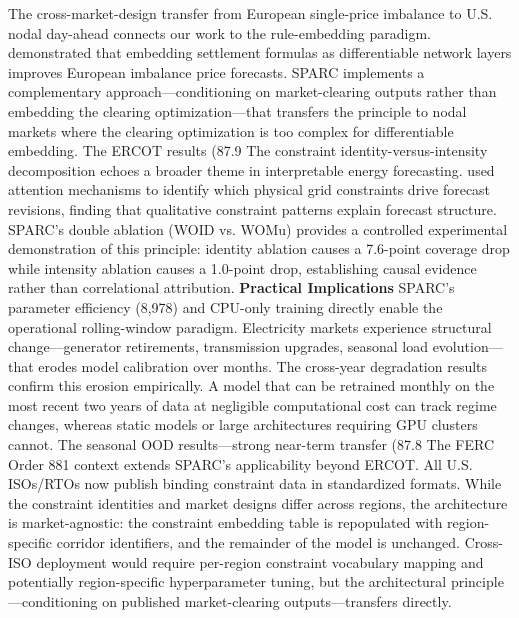 {The cross-market-design transfer from European single-price imbalance to U.S. nodal day-ahead connects our work to the rule-embedding paradigm. \cite{yu2026marketruleinformed} demonstrated that embedding settlement formulas as differentiable network layers improves European imbalance price forecasts. SPARC implements a complementary approach---conditioning on market-clearing outputs rather than embedding the clearing optimization---that transfers the principle to nodal markets where the clearing optimization is too complex for differentiable embedding. The ERCOT results (87.9%
The constraint identity-versus-intensity decomposition echoes a broader theme in interpretable energy forecasting. \cite{toubeau2021interpretable} used attention mechanisms to identify which physical grid constraints drive forecast revisions, finding that qualitative constraint patterns explain forecast structure. SPARC's double ablation (WOID vs. WOMu) provides a controlled experimental demonstration of this principle: identity ablation causes a 7.6-point coverage drop while intensity ablation causes a 1.0-point drop, establishing causal evidence rather than correlational attribution.
\textbf{Practical Implications}
SPARC's parameter efficiency (8,978) and CPU-only training directly enable the operational rolling-window paradigm. Electricity markets experience structural change---generator retirements, transmission upgrades, seasonal load evolution---that erodes model calibration over months. The cross-year degradation results confirm this erosion empirically. A model that can be retrained monthly on the most recent two years of data at negligible computational cost can track regime changes, whereas static models or large architectures requiring GPU clusters cannot. The seasonal OOD results---strong near-term transfer (87.8%
The FERC Order 881 context extends SPARC's applicability beyond ERCOT. All U.S. ISOs/RTOs now publish binding constraint data in standardized formats. While the constraint identities and market designs differ across regions, the architecture is market-agnostic: the constraint embedding table is repopulated with region-specific corridor identifiers, and the remainder of the model is unchanged. Cross-ISO deployment would require per-region constraint vocabulary mapping and potentially region-specific hyperparameter tuning, but the architectural principle---conditioning on published market-clearing outputs---transfers directly.
}
